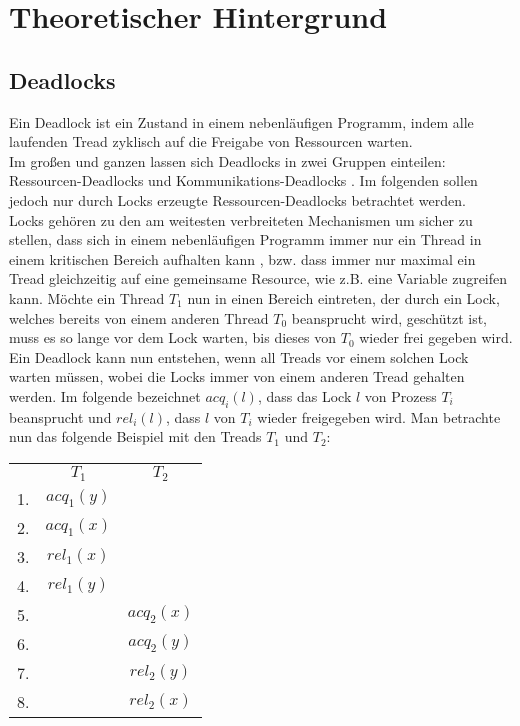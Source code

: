 \chapter{Theoretischer Hintergrund}

\section{Deadlocks} \label{Kap::Theo:Deadlocks}

Ein Deadlock ist ein Zustand in einem nebenläufigen Programm, indem alle 
laufenden Tread zyklisch auf die Freigabe von Ressourcen warten.\\
Im großen und ganzen lassen sich Deadlocks in zwei Gruppen einteilen: 
Ressourcen-Deadlocks und Kommunikations-Deadlocks \cite{zhou}.
Im folgenden sollen jedoch nur durch Locks erzeugte Ressourcen-Deadlocks 
betrachtet werden.\\
Locks gehören zu den am weitesten verbreiteten Mechanismen um sicher zu stellen,
dass sich in einem nebenläufigen Programm immer nur ein Thread in einem 
kritischen Bereich aufhalten kann \cite*{zhou}, bzw.
dass immer nur maximal ein Tread gleichzeitig auf eine gemeinsame Resource, wie 
z.B. eine Variable zugreifen kann. Möchte ein Thread $T_1$ nun in einen Bereich 
eintreten, der durch ein Lock, welches bereits von einem anderen Thread $T_0$ beansprucht wird, geschützt ist, muss es so lange vor dem Lock warten, bis dieses von $T_0$ wieder frei gegeben wird.\\
Ein Deadlock kann nun entstehen, wenn all Treads vor einem solchen Lock warten 
müssen, wobei die Locks immer von einem anderen Tread gehalten werden. 
Im folgende bezeichnet $acq_i(l)$, dass das Lock $l$ von Prozess $T_i$ 
beansprucht und $rel_i(l)$, dass $l$ von $T_i$ wieder freigegeben wird. 
Man betrachte nun das folgende Beispiel \cite{sulzmann} mit den Treads 
$T_1$ und $T_2$:
\begin{table}[H]
    \centering
    \begin{tabular}{ccc}
       & $T_1$        & $T_2$          \\
    1. & $acq_{1}(y)$ &                \\
    2. & $acq_{1}(x)$ &                \\
    3. & $rel_{1}(x)$ &                \\
    4. & $rel_{1}(y)$ &                \\
    5. &              & $acq_{2}(x)$ \\
    6. &              & $acq_{2}(y)$ \\
    7. &              & $rel_{2}(y)$ \\
    8. &              & $rel_{2}(x)$
    \end{tabular}
\end{table}
